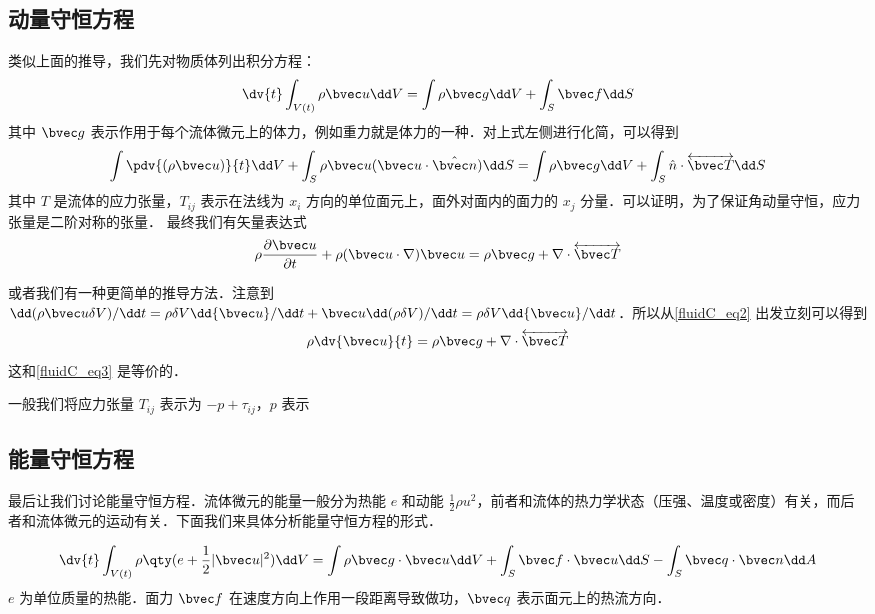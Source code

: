\subsection{动量守恒方程}
类似上面的推导，我们先对物质体列出积分方程：
\begin{equation}\label{fluidC_eq2}
\dv{t}\int_{V(t)} \rho \bvec u \dd V=\int \rho \bvec g\dd V+\int_S \bvec f\dd S
\end{equation}
其中 $\bvec g$ 表示作用于每个流体微元上的体力，例如重力就是体力的一种．对上式左侧进行化简，可以得到
\begin{equation}
\int \pdv{(\rho \bvec u)}{t}\dd V+\int_S\rho \bvec u (\bvec u\cdot \hat{\bvec n})\dd S=\int \rho\bvec g\dd V+\int_S \hat n\cdot \overleftrightarrow {\bvec T}\dd S
\end{equation}
其中 $T$ 是流体的应力张量，$T_{ij}$ 表示在法线为 $x_i$ 方向的单位面元上，面外对面内的面力的 $x_j$ 分量．可以证明，为了保证角动量守恒，应力张量是二阶对称的张量．
最终我们有矢量表达式
\begin{equation}\label{fluidC_eq3}
\rho \frac{\partial \bvec u}{\partial t}+\rho(\bvec u\cdot \nabla)\bvec u=\rho \bvec g+\nabla\cdot \overleftrightarrow {\bvec T}
\end{equation}

或者我们有一种更简单的推导方法．注意到 $\dd(\rho \bvec u \delta V)/\dd t=\rho \delta V \dd {\bvec u}/\dd t+\bvec u \dd (\rho \delta V)/\dd t=\rho \delta V \dd {\bvec u}/\dd t$．所以从\autoref{fluidC_eq2} 出发立刻可以得到
\begin{equation}
\rho \dv{\bvec u}{t}=\rho \bvec g+\nabla\cdot \overleftrightarrow {\bvec T}
\end{equation}
这和\autoref{fluidC_eq3} 是等价的．

一般我们将应力张量 $T_{ij}$ 表示为 $-p+\tau_{ij}$，$p$ 表示

\subsection{能量守恒方程}
最后让我们讨论能量守恒方程．流体微元的能量一般分为热能 $e$ 和动能 $\frac{1}{2}\rho u^2$，前者和流体的热力学状态（压强、温度或密度）有关，而后者和流体微元的运动有关．下面我们来具体分析能量守恒方程的形式．

\begin{equation}
\dv{t} \int_{V(t)} \rho\qty(e+\frac{1}{2}|\bvec u|^2)\dd V=\int \rho \bvec g\cdot \bvec u \dd V+\int_S \bvec f\cdot \bvec u \dd S -\int_S \bvec q\cdot \bvec n\dd A
\end{equation}
$e$ 为单位质量的热能．面力 $\bvec f$ 在速度方向上作用一段距离导致做功，$\bvec q$ 表示面元上的热流方向．

